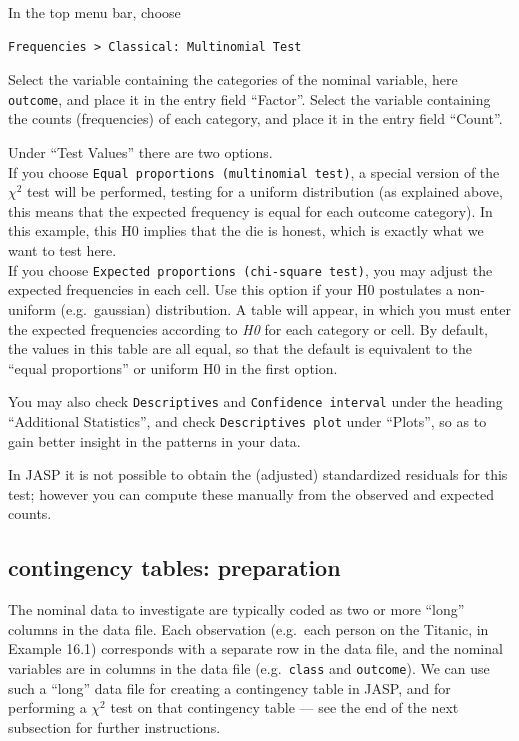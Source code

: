 \documentclass[
]{book}
\begin{document}
In the top menu bar, choose

\begin{verbatim}
Frequencies > Classical: Multinomial Test
\end{verbatim}

Select the variable containing the categories of the nominal variable, here \texttt{outcome}, and place it in the entry field ``Factor''.
Select the variable containing the counts (frequencies) of each category, and place it in the entry field ``Count''.

Under ``Test Values'' there are two options.\\
If you choose \texttt{Equal\ proportions\ (multinomial\ test)}, a special version of the \(\chi^2\) test will be performed, testing for a uniform distribution (as explained above, this means that the expected frequency is equal for each outcome category). In this example, this H0 implies that the die is honest, which is exactly what we want to test here.\\
If you choose \texttt{Expected\ proportions\ (chi-square\ test)}, you may adjust the expected frequencies in each cell. Use this option if your H0 postulates a non-uniform (e.g.~gaussian) distribution. A table will appear, in which you must enter the expected frequencies according to \emph{H0} for each category or cell. By default, the values in this table are all equal, so that the default is equivalent to the ``equal proportions'' or uniform H0 in the first option.

You may also check \texttt{Descriptives} and \texttt{Confidence\ interval} under the heading ``Additional Statistics'', and check \texttt{Descriptives\ plot} under ``Plots'', so as to gain better insight in the patterns in your data.

In JASP it is not possible to obtain the (adjusted) standardized residuals for this test; however you can compute these manually from the observed and expected counts.

\subsection{contingency tables: preparation}\label{contingency-tables-preparation-1}

The nominal data to investigate are typically coded as two or more ``long'' columns in the data file. Each observation (e.g.~each person on the Titanic, in Example 16.1) corresponds with a separate row in the data file, and the nominal variables are in columns in the data file (e.g.~\texttt{class} and \texttt{outcome}). We can use such a ``long'' data file for creating a contingency table in JASP, and for performing a \(\chi^2\) test on that contingency table --- see the end of the next subsection for further instructions.
\end{document}
